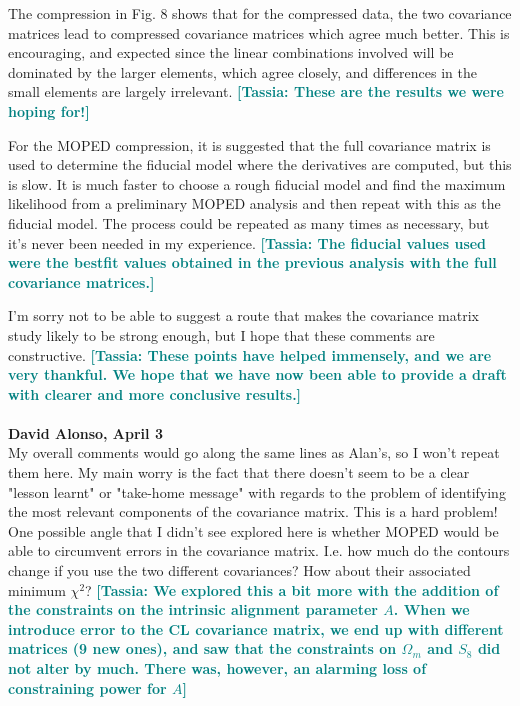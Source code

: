 \documentclass{article}
\newcommand\tassia[1]{{\bf {\textcolor{teal}{[Tassia: #1]}}}}
\begin{document}
	The compression in Fig. 8 shows that for the compressed data, the two covariance matrices lead to compressed covariance matrices which agree much better.  This is encouraging, and expected since the linear combinations involved will be dominated by the larger elements, which agree closely, and differences in the small elements are largely irrelevant. \tassia{These are the results we were hoping for!}
	
	For the MOPED compression, it is suggested that the full covariance matrix is used to determine the fiducial model where the derivatives are computed, but this is slow. It is much faster to choose a rough fiducial model and find the maximum likelihood from a preliminary MOPED analysis and then repeat with this as the fiducial model.  The process could be repeated as many times as necessary, but it’s never been needed in my experience. \tassia{The fiducial values used were the bestfit values obtained in the previous analysis with the full covariance matrices.}
	
	I’m sorry not to be able to suggest a route that makes the covariance matrix study likely to be strong enough, but I hope that these comments are constructive. \tassia{These points have helped immensely, and we are very thankful. We hope that we have now been able to provide a draft with clearer and more conclusive results.}\\  \\
	
	
	\textbf{David Alonso, April 3} \\
	
	My overall comments would go along the same lines as Alan's, so I won't repeat them here. My main worry is the fact that there doesn't seem to be a clear "lesson learnt" or "take-home message" with regards to the problem of identifying the most relevant components of the covariance matrix. This is a hard problem! One possible angle that I didn't see explored here is whether MOPED would be able to circumvent errors in the covariance matrix. I.e. how much do the contours change if you use the two different covariances? How about their associated minimum $\chi^2$? \tassia{We explored this a bit more with the addition of the constraints on the intrinsic alignment parameter $A$. When we introduce error to the CL covariance matrix, we end up with different matrices (9 new ones), and saw that the constraints on $\Omega_m$ and $S_8$ did not alter by much. There was, however, an alarming loss of constraining power for $A$}
	
\end{document}
